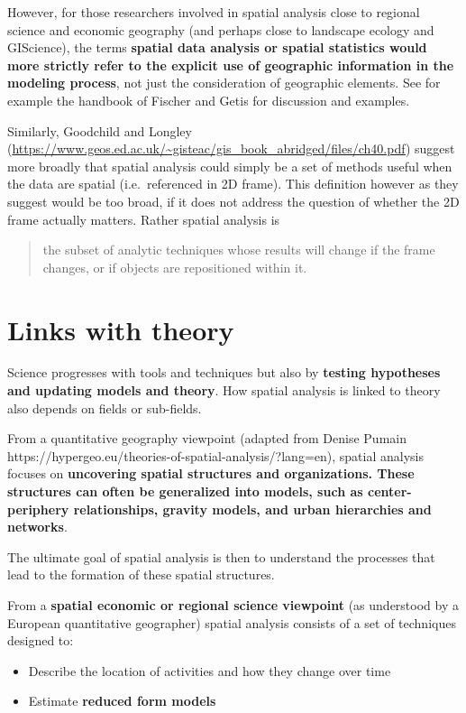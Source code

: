 \documentclass[
  letterpaper,
  DIV=11,
  numbers=noendperiod]{scrreprt}
\providecommand{\tightlist}{%
  \setlength{\itemsep}{0pt}\setlength{\parskip}{0pt}}\usepackage{longtable,booktabs,array}
\begin{document}
However, for those researchers involved in spatial analysis close to
regional science and economic geography (and perhaps close to landscape
ecology and GIScience), the terms \textbf{spatial data analysis or
spatial statistics would more strictly refer to the explicit use of
geographic information in the modeling process}, not just the
consideration of geographic elements. See for example the handbook of
Fischer and Getis for discussion and examples.

Similarly, Goodchild and Longley
(\url{https://www.geos.ed.ac.uk/~gisteac/gis_book_abridged/files/ch40.pdf})
suggest more broadly that spatial analysis could simply be a set of
methods useful when the data are spatial (i.e.~referenced in 2D frame).
This definition however as they suggest would be too broad, if it does
not address the question of whether the 2D frame actually matters.
Rather spatial analysis is

\begin{quote}
the subset of analytic techniques whose results will change if the frame
changes, or if objects are repositioned within it.
\end{quote}

\section{Links with theory}\label{links-with-theory}

Science progresses with tools and techniques but also by \textbf{testing
hypotheses and updating models and theory}. How spatial analysis is
linked to theory also depends on fields or sub-fields.

From a quantitative geography viewpoint (adapted from Denise Pumain
https://hypergeo.eu/theories-of-spatial-analysis/?lang=en), spatial
analysis focuses on \textbf{uncovering spatial structures and
organizations. These structures can often be generalized into models,
such as center-periphery relationships, gravity models, and urban
hierarchies and networks}.

The ultimate goal of spatial analysis is then to understand the
processes that lead to the formation of these spatial structures.

From a \textbf{spatial economic or regional science viewpoint} (as
understood by a European quantitative geographer) spatial analysis
consists of a set of techniques designed to:

\begin{itemize}
\tightlist
\item
  Describe the location of activities and how they change over time
\item
  Estimate \textbf{reduced form models}
\end{itemize}
\end{document}
